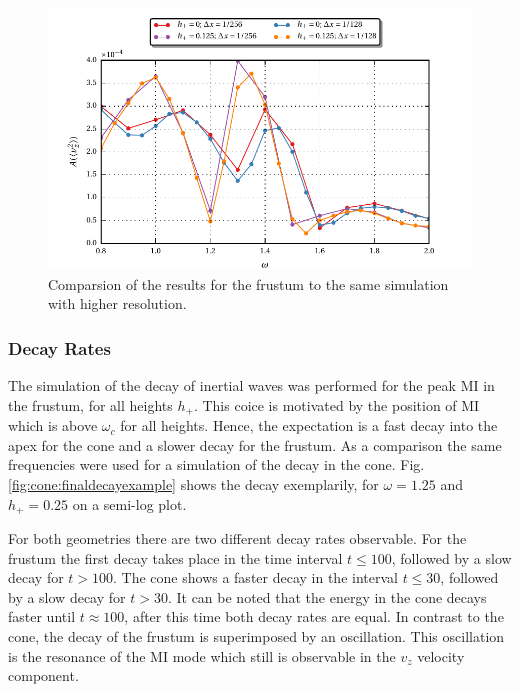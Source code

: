 \begin{figure}[!b]
  \centering
  \includegraphics{gfx/cone/final/hd_comparison.pdf}
  \caption{
      \label{fig:cone:finalhdcomp}
      Comparsion of the results for the frustum to the same simulation with higher resolution.
    }
\end{figure}
\clearpage

\subsubsection{Decay Rates}

The simulation of the decay of inertial waves was performed for the peak M\RN{1} in the frustum,
for all heights $h_+$.
This coice is motivated by the position of M\RN{1} which is above $\omega_c$ for all heights.
Hence, the expectation is a fast decay into the apex for the cone and a slower decay for the frustum.
As a comparison the same frequencies were used for a simulation of the decay in the cone.
Fig. \ref{fig:cone:finaldecayexample} shows the decay exemplarily,
for $\omega=1.25$ and $h_+=0.25$ on a semi-log plot.

For both geometries there are two different decay rates observable.
For the frustum the first decay takes place in the time interval $t\leq 100$,
followed by a slow decay for $t>100$.
The cone shows a faster decay in the interval $ t\leq 30$, followed by a slow decay for $t>30$.
It can be noted that the energy in the cone decays faster until $t\approx100$, after this time
both decay rates are  equal.  In contrast to the cone, the decay of the frustum  is superimposed by an oscillation.
This oscillation is the resonance of the M\RN{1} mode which still is observable in the $v_z$ velocity component.


